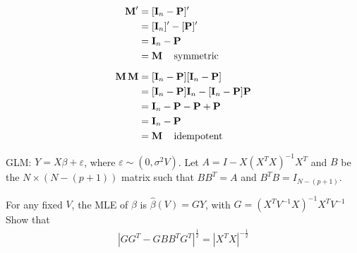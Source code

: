 \documentclass[UTF8,a4paper,10pt]{article}
\begin{document}
\begin{solution}
\begin{mybox}{}
\begin{multicols*}{2}
      \begin{align*}
        \operatorname{\mathbf{M}}' &=[\mathbf{I}_n-\mathbf{P}]'\\
        & = [\mathbf{I}_n]'-[\mathbf{P}]'\\
        & = \mathbf{I}_n-\mathbf{P}\\
        & = \operatorname{\mathbf{M}}\quad\text{symmetric}
\\[6pt]
        \operatorname{\mathbf{M}}\operatorname{\mathbf{M}} &=[\mathbf{I}_n-\mathbf{P}][\mathbf{I}_n-\mathbf{P}]\\
        & = [\mathbf{I}_n-\mathbf{P}]\mathbf{I}_n-[\mathbf{I}_n-\mathbf{P}]\mathbf{P}\\
        &=\mathbf{I}_n-\mathbf{P}-\mathbf{P}+\mathbf{P}\\
        &=\mathbf{I}_n-\mathbf{P}\\
        &=\operatorname{\mathbf{M}} \quad\text{idempotent}
    \end{align*}

  \end{multicols*}

  \end{mybox}



    \end{solution}
    
  \begin{Problem}[]{}

    GLM: \(Y = X\beta +\varepsilon \), where \(\varepsilon \sim(0,\sigma^2V)\).
    Let \(A = I-X(X^{T}X)^{-1}X^{T}\) and \(B\) be the \(N\times (N-(p+1))\) matrix such that \(BB^{T} = A\) and \(B^{T}B = I_{N-(p+1)}\).

    For any fixed \(V\), the MLE of \(\beta\) is \(\hat{\beta}(V) = GY\), with \(G = (X^{T}V^{-1}X)^{-1}X^{T}V^{-1}\)
    Show that
    \begin{equation*}
      \begin{aligned}
        |GG^{T}-GBB^{T}G^{T}|^{\frac{1}{2}} = |X^{T}X|^{-\frac{1}{2}}
      \end{aligned}
    \end{equation*}
    
      \end{Problem} 
  
\end{document}
